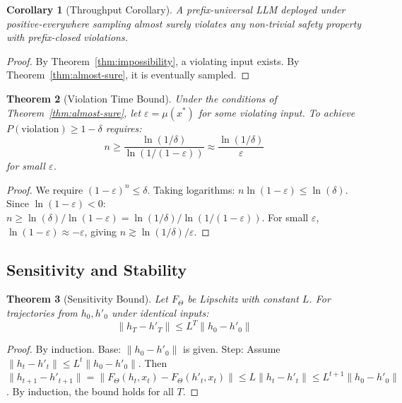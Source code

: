 \documentclass[11pt,a4paper]{article}
\newtheorem{theorem}{Theorem}[section]
\newtheorem{corollary}[theorem]{Corollary}
\begin{document}
\begin{corollary}[Throughput Corollary]
A prefix-universal LLM deployed under positive-everywhere sampling almost surely violates any non-trivial safety property with prefix-closed violations.
\end{corollary}

\begin{proof}
By Theorem~\ref{thm:impossibility}, a violating input exists. By Theorem~\ref{thm:almost-sure}, it is eventually sampled.
\end{proof}

\begin{theorem}[Violation Time Bound]
\label{thm:violation-time}
Under the conditions of Theorem~\ref{thm:almost-sure}, let $\varepsilon = \mu(x^*)$ for some violating input. To achieve $P(\text{violation}) \geq 1 - \delta$ requires:
\begin{equation}
n \geq \frac{\ln(1/\delta)}{\ln(1/(1-\varepsilon))} \approx \frac{\ln(1/\delta)}{\varepsilon}
\end{equation}
for small $\varepsilon$.
\end{theorem}

\begin{proof}
We require $(1-\varepsilon)^n \leq \delta$. Taking logarithms: $n \ln(1-\varepsilon) \leq \ln(\delta)$. Since $\ln(1-\varepsilon) < 0$: $n \geq \ln(\delta)/\ln(1-\varepsilon) = \ln(1/\delta)/\ln(1/(1-\varepsilon))$. For small $\varepsilon$, $\ln(1-\varepsilon) \approx -\varepsilon$, giving $n \gtrsim \ln(1/\delta)/\varepsilon$.
\end{proof}

\subsection{Sensitivity and Stability}

\begin{theorem}[Sensitivity Bound]
\label{thm:sensitivity}
Let $F_\Theta$ be Lipschitz with constant $L$. For trajectories from $h_0, h'_0$ under identical inputs:
\begin{equation}
\|h_T - h'_T\| \leq L^T \|h_0 - h'_0\|
\end{equation}
\end{theorem}

\begin{proof}
By induction. Base: $\|h_0 - h'_0\|$ is given. Step: Assume $\|h_t - h'_t\| \leq L^t \|h_0 - h'_0\|$. Then $\|h_{t+1} - h'_{t+1}\| = \|F_\Theta(h_t, x_t) - F_\Theta(h'_t, x_t)\| \leq L\|h_t - h'_t\| \leq L^{t+1}\|h_0 - h'_0\|$. By induction, the bound holds for all $T$.
\end{proof}
\end{document}
